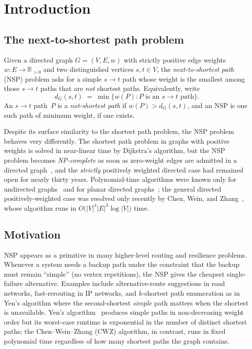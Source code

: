 \chapter{Introduction}
\label{ch:intro}

\section{The next-to-shortest path problem}

Given a directed graph $G=(V,E,w)$ with strictly positive edge weights
$w:E\to\mathbb{R}_{>0}$ and two distinguished vertices $s,t\in V$, the
\emph{next-to-shortest path} (NSP) problem asks for a simple $s\to t$ path
whose weight is the smallest among those $s\to t$ paths that are \emph{not}
shortest paths. Equivalently, write
\[
  d_G(s,t)\;=\;\min\bigl\{w(P) : P \text{ is an } s\to t \text{ path}\bigr\}.
\]
An $s\to t$ path~$P$ is a \emph{not-shortest path} if $w(P) > d_G(s,t)$, and an
NSP is one such path of minimum weight, if one exists.

Despite its surface similarity to the shortest path problem, the NSP problem
behaves very differently. The shortest path problem in graphs with positive
weights is solved in near-linear time by Dijkstra's algorithm, but the NSP
problem becomes \emph{NP-complete} as soon as zero-weight edges are
admitted in a directed graph~\cite{LalgudiPapaefthymiou1997}, and the
\emph{strictly} positively weighted directed case had remained open for nearly
thirty years. Polynomial-time algorithms were known only for undirected
graphs~\cite{KrasikovNoble2004,Wu2010} and for planar directed
graphs~\cite{WuWang2015}; the general directed positively-weighted case was
resolved only recently by Chen, Wein, and Zhang~\cite{ChenWeinZhang2025},
whose algorithm runs in $O\bigl(|V|^{4}|E|^{3}\log|V|\bigr)$ time.

\section{Motivation}

NSP appears as a primitive in many higher-level routing and resilience
problems. Whenever a system needs a backup path under the constraint that
the backup must remain ``simple'' (no vertex repetitions), the NSP gives the
cheapest single-failure alternative. Examples include alternative-route
suggestions in road networks, fast-rerouting in IP networks, and
$k$-shortest path enumeration as in Yen's algorithm where the second-shortest
\emph{simple} path matters when the shortest is unavailable. Yen's
algorithm~\cite{Yen1971} produces simple paths in non-decreasing weight order
but its worst-case runtime is exponential in the number of distinct shortest
paths; the Chen--Wein--Zhang (CWZ) algorithm, in contrast, runs in fixed
polynomial time regardless of how many shortest paths the graph contains.

